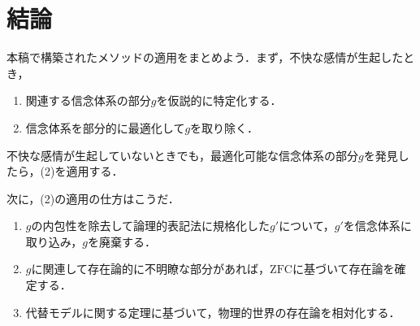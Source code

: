 \section{結論}
\label{sec:結論}

本稿で構築されたメソッドの適用をまとめよう．まず，不快な感情が生起したとき，
\begin{enumerate}[label=(\arabic*)]
    \item 関連する信念体系の部分$g$を仮説的に特定化する．
    \item 信念体系を部分的に最適化して$g$を取り除く．
\end{enumerate}
不快な感情が生起していないときでも，最適化可能な信念体系の部分$g$を発見したら，(2)を適用する．

次に，(2)の適用の仕方はこうだ．
\begin{enumerate}[label=(\arabic*)]
    \item $g$の内包性を除去して論理的表記法に規格化した$g'$について，$g'$を信念体系に取り込み，$g$を廃棄する．
    \item $g$に関連して存在論的に不明瞭な部分があれば，$\mathrm{ZFC}$に基づいて存在論を確定する．
    \item 代替モデルに関する定理に基づいて，物理的世界の存在論を相対化する．
\end{enumerate}

